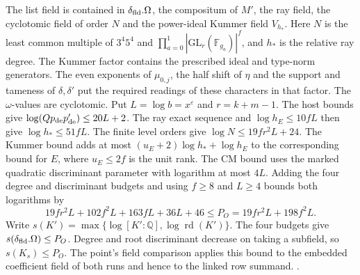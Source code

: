 The list field is contained in \(\delta_{\rm fld}.\Omega\), the compositum of
\(M'\), the ray field, the cyclotomic field of order \(N\) and the
power-ideal Kummer field \(V_{h_*}\). Here \(N\) is the least common multiple of
\(3^4 5^4\) and \(\prod_{a=0}^1|\mathrm{GL}_r(\mathbb F_{g_a})|^f\),
and \(h_*\) is the relative ray degree. The Kummer factor contains
the prescribed ideal and type-norm generators.
The even exponents of \(\mu_{0,j}\), the half shift of \(\eta\) and the
support and tameness of \(\delta,\delta'\) put the required readings of
these characters in that factor. The \(\omega\)-values are cyclotomic.
Put \(L=\log b=x^\varepsilon\) and \(r=k+m-1\).
The host bounds give \(\log(Qp_{\rm de}p'_{\rm de})\le20L+2\).
The ray exact sequence and \(\log h_E\le10 fL\) then give
\(\log h_*\le51 fL\). The finite level orders give
\(\log N\le19fr^2L+24\). The Kummer bound adds at most
\((u_E+2)\log h_*+\log h_E\) to the corresponding bound for \(E\),
where \(u_E\le2f\) is the unit rank. The CM bound uses the marked
quadratic discriminant parameter with logarithm at most \(4L\).
Adding the four degree and discriminant budgets and using \(f\ge8\)
and \(L\ge4\) bounds both logarithms by
\[
 19fr^2L+102f^2L+163fL+36L+46\le P_O=19fr^2L+198f^2L.
\]
Write \(s(K')=\max\{\log[K':\mathbb Q],\log\operatorname{rd}(K')\}\).
The four budgets give \(s(\delta_{\rm fld}.\Omega)\le P_O\). Degree and
root discriminant decrease on taking a subfield, so \(s(K_s)\le P_O\).
The point's field comparison applies this bound to the embedded
coefficient field of both runs and hence to the linked row summand.
.

